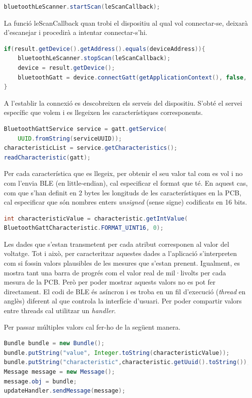 \begin{lstlisting}[language=java]
bluetoothLeScanner.startScan(leScanCallback);
\end{lstlisting}

La funció leScanCallback quan trobi el dispositiu al qual vol connectar-se, deixarà d'escanejar i procedirà a intentar connectar-s'hi.
\begin{lstlisting}[language=java]
if(result.getDevice().getAddress().equals(deviceAddress)){
	bluetoothLeScanner.stopScan(leScanCallback);
	device = result.getDevice();
	bluetoothGatt = device.connectGatt(getApplicationContext(), false, gattCallback);
}
\end{lstlisting}

A l'establir la connexió es descobreixen els serveis del dispositiu.
S'obté el servei específic que volem i es llegeixen les característiques corresponents.

\begin{lstlisting}[language=java]
BluetoothGattService service = gatt.getService(
	UUID.fromString(serviceUUID));
characteristicList = service.getCharacteristics();
readCharacteristic(gatt);
\end{lstlisting}

Per cada característica que es llegeix, per obtenir el seu valor tal com es vol i no com l'envia BLE (en little-endian), cal especificar el format que té.
En aquest cas, com que s'han definit en 2 bytes les longituds de les característiques en la PCB, cal especificar que són nombres enters \textit{unsigned} (sense signe) codificats en 16 bits.

\begin{lstlisting}[language=java]
int characteristicValue = characteristic.getIntValue(
BluetoothGattCharacteristic.FORMAT_UINT16, 0);
\end{lstlisting}

Les dades que s'estan transmetent per cada atribut corresponen al valor del voltatge.
Tot i això, per caracteritzar aquestes dades a l'aplicació s'interpreten com si fossin valors plausibles de les mesures que s'estan prenent.
Igualment, es mostra tant una barra de progrés com el valor real de mil·livolts per cada mesura de la PCB.
Però per poder mostrar aquests valors no es pot fer directament.
El codi de BLE és asíncron i es troba en un fil d'execució (\textit{thread} en anglès) diferent al que controla la interfície d'usuari.
Per poder compartir valors entre threads cal utilitzar un \textit{handler}.

Per passar múltiples valors cal fer-ho de la següent manera.
\begin{lstlisting}[language=java]
Bundle bundle = new Bundle();
bundle.putString("value", Integer.toString(characteristicValue));
bundle.putString("characteristic",characteristic.getUuid().toString());
Message message = new Message();
message.obj = bundle;
updateHandler.sendMessage(message);
\end{lstlisting}

